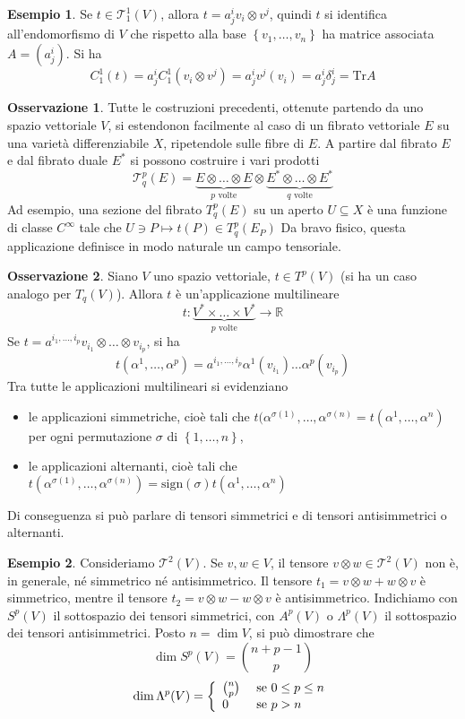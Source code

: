 \documentclass[a4paper,11pt]{article}
\theoremstyle{definition}
\newtheorem{osservazione}{Osservazione}[section]
\newtheorem{esempio}{Esempio}[section]
\theoremstyle{theorem}
\newcommand{\T}{\mathcal{T}}
\begin{document}
\begin{esempio}
	Se $t\in \T^1_1(V)$, allora $t=a^i_jv_i\otimes v^j$, quindi $t$ si identifica all'endomorfismo di $V$ che rispetto alla base $\left\{v_1,\dots,v_n\right\}$ ha matrice associata $A=\left(a^i_j\right)$. Si ha
	\[C^1_1(t)=a^i_jC^1_1(v_i\otimes v^j)=a^i_jv^j(v_i)=a^i_j\delta^i_j=\textrm{Tr}A\]
\end{esempio}
\begin{osservazione}
	Tutte le costruzioni precedenti, ottenute partendo da uno spazio vettoriale $V$, si estendonon facilmente al caso di un fibrato vettoriale $E$ su una varietà differenziabile $X$, ripetendole sulle fibre di $E$. A partire dal fibrato $E$ e dal fibrato duale $E^*$ si possono costruire i vari prodotti
	\[\T^p_q(E)=\underbrace{E\otimes\dots\otimes E}_{\text{$p$ volte}}\otimes\underbrace{E^*\otimes\dots\otimes E^*}_{\textrm{$q$ volte}}\]
	Ad esempio, una sezione del fibrato $T^p_q(E)$ su un aperto $U\subseteq X$ è una funzione di classe $C^\infty$ tale che $U\ni P\mapsto t(P)\in T^p_q(E_P)$ Da bravo fisico, questa applicazione definisce in modo naturale un campo tensoriale.
\end{osservazione}
\begin{osservazione}
	Siano $V$ uno spazio vettoriale, $t\in T^p(V)$ (si ha un caso analogo per $T_q(V)$). Allora $t$ è un'applicazione multilineare
	\[t\colon \underbrace{V^*\times\dots\times V^*}_{\textrm{$p$ volte}}\to\mathbb{R}\]
	Se $t=a^{i_1,\dots,i_p}v_{i_1}\otimes\dots\otimes v_{i_p}$, si ha
	\[t(\alpha^1,\dots,\alpha^p)=a^{i_1,\dots,i_p}\alpha^1(v_{i_1})\dots\alpha^p(v_{i_p})\]
	Tra tutte le applicazioni multilineari si evidenziano
	\begin{itemize}
		\item le applicazioni simmetriche, cioè tali che $t(\alpha^{\sigma(1)},\dots,\alpha^{\sigma(n)}=t(\alpha^1,\dots,\alpha^n)$ per ogni permutazione $\sigma$ di $\left\{1,\dots,n\right\}$,
		\item le applicazioni alternanti, cioè tali che $t(\alpha^{\sigma(1)},\dots,\alpha^{\sigma(n)})=\mathrm{sign}(\sigma)t(\alpha^1,\dots,\alpha^n)$
	\end{itemize}
	Di conseguenza si può parlare di tensori simmetrici e di tensori antisimmetrici o alternanti.
\end{osservazione}
\begin{esempio}
	Consideriamo $\T^2(V)$. Se $v,w\in V$, il tensore $v\otimes w\in \T^2(V)$ non è, in generale, né simmetrico né antisimmetrico. Il tensore $t_1=v\otimes w+w\otimes v$ è simmetrico, mentre il tensore $t_2=v\otimes w-w\otimes v$ è antisimmetrico. Indichiamo con $S^p(V)$ il sottospazio dei tensori simmetrici, con $A^p(V)$ o $\Lambda^p(V)$ il sottospazio dei tensori antisimmetrici. Posto $n=\dim V$, si può dimostrare che
	\[\dim S^p(V)=\binom{n+p-1}{p}\]
	\[\dim\Lambda^p(V)=\left\{\begin{array}{l l}
	\binom{n}{p} &\textrm{ se $0\leq p\leq n$}\\
	0 &\textrm{ se $p>n$}
	\end{array}\right.\]
\end{esempio}
\end{document}
